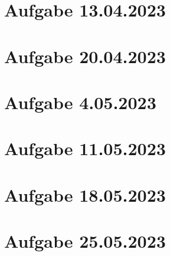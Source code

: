\chapter{Aufgabe 13.04.2023}

\chapter{Aufgabe 20.04.2023}

\chapter{Aufgabe 4.05.2023}

\chapter{Aufgabe 11.05.2023}

\chapter{Aufgabe 18.05.2023}


\chapter{Aufgabe 25.05.2023}
